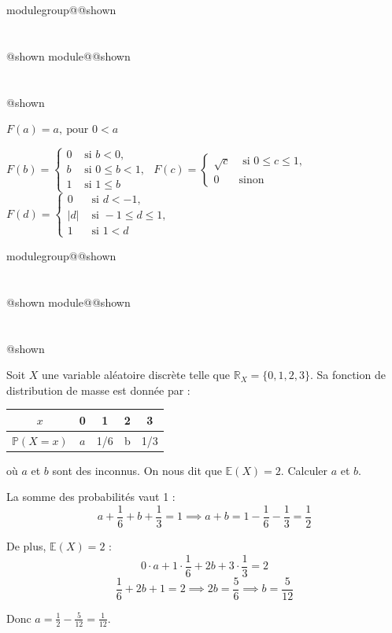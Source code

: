 \documentclass{Evaluation}
\makeatletter
\newcommand{\currentmodulekey}{}
\newcommand{\currentmoduletitle}{}
\newcommand{\currentgroupkey}{}
\newcommand{\currentgrouptitle}{}
\newcommand{\showmoduleifneeded}{%
  \ifx\currentgroupkey\empty\else
    \expandafter\ifx\csname modulegroup@\currentgroupkey @shown\endcsname\relax
      \section*{\currentgrouptitle}%
      \expandafter\gdef\csname modulegroup@\currentgroupkey @shown\endcsname{1}%
    \fi
  \fi
  \expandafter\ifx\csname module@\currentmodulekey @shown\endcsname\relax
    \section*{\currentmoduletitle}%
    \expandafter\gdef\csname module@\currentmodulekey @shown\endcsname{1}%
  \fi
}
\newenvironment{H23}{\showmoduleifneeded}{}
\newenvironment{A25}{\showmoduleifneeded}{}
\makeatother
\begin{document}
\begin{questions}
\begin{A25}
\begin{checkboxes}
\choice $F(a)=a,\ \mbox{pour } 0 <a$
		
\correctchoice $ F(b) = \left\{
			\begin{array}{ll}
			0  & \mbox{ si } b<0, \\
			b & \mbox{ si } 0\leq b < 1,\\
			1 & \mbox{ si } 1 \leq b
			\end{array}
			\right. $
\choice $ F(c) = \left\{
			\begin{array}{ll}
			\sqrt{c}  & \mbox{ si } 0\leq c\leq 1, \\
			0 & \mbox{sinon}
			\end{array}
			\right. $
\choice $ F(d) = \left\{
			\begin{array}{ll}
			0  & \mbox{ si } d < -1, \\
			|d| & \mbox{ si } -1 \leq d \leq 1,\\
			1 &  \mbox{ si } 1 < d
			\end{array}
			\right. $
\end{checkboxes}
\end{A25}

\begin{H23}
\question {} %
Soit $X$ une variable aléatoire discrète telle que $\mathbb{R}_X=\{0,1,2,3\}$. Sa fonction de distribution  de masse est donnée par :
\begin{center}
\begin{tabular}{ |c|c|c|c|c| } 
 \hline
 $x$ & 0 & 1 & 2 & 3 \\
 \hline
 $\mathbb{P}(X=x)$ & $a$ & 1/6 & b & 1/3 \\
 \hline
 \end{tabular}
 \end{center}
 où $a$ et $b$ sont des inconnus.
On nous dit que $\mathbb{E}(X)=2$. Calculer $a$ et $b$.

\begin{solution}
La somme des probabilités vaut 1 :
$$a + \frac{1}{6} + b + \frac{1}{3} = 1 \implies a + b = 1 - \frac{1}{6} - \frac{1}{3} = \frac{1}{2}$$

De plus, $\mathbb{E}(X) = 2$ :
$$0 \cdot a + 1 \cdot \frac{1}{6} + 2b + 3 \cdot \frac{1}{3} = 2$$
$$\frac{1}{6} + 2b + 1 = 2 \implies 2b = \frac{5}{6} \implies b = \frac{5}{12}$$

Donc $a = \frac{1}{2} - \frac{5}{12} = \frac{1}{12}$.
\end{solution}
\end{H23}


\end{questions}
\end{document}
